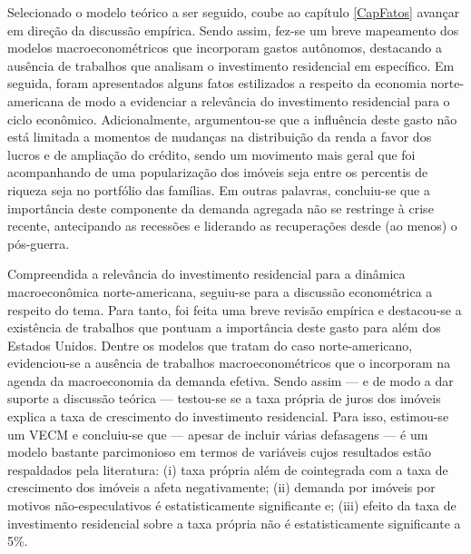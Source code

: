 Selecionado o modelo teórico a ser seguido, coube ao capítulo \ref{CapFatos} avançar em direção da discussão empírica.
Sendo assim, fez-se um breve mapeamento dos modelos macroeconométricos que incorporam gastos autônomos, destacando a ausência de trabalhos que analisam o investimento residencial em específico.
Em seguida, foram apresentados alguns fatos estilizados a respeito da economia norte-americana de modo a evidenciar a relevância do investimento residencial para o ciclo econômico.
Adicionalmente, argumentou-se que a influência deste gasto não está limitada a momentos de mudanças na distribuição da renda a favor dos lucros e de ampliação do crédito, sendo um movimento mais geral que foi acompanhando de uma popularização dos imóveis seja entre os percentis de riqueza seja no portfólio das famílias.
Em outras palavras,
concluiu-se que a importância deste componente da demanda agregada não se restringe à crise recente, antecipando as recessões  e liderando as recuperações desde (ao menos) o pós-guerra.


Compreendida a relevância do investimento residencial para a dinâmica macroeconômica norte-americana, seguiu-se para a discussão econométrica a respeito do tema.
Para tanto, foi feita uma breve revisão empírica e destacou-se a existência de trabalhos que pontuam a importância deste gasto para além dos Estados Unidos.
Dentre os modelos que tratam do caso norte-americano, evidenciou-se a ausência de trabalhos macroeconométricos que o incorporam na agenda da macroeconomia da demanda efetiva.
Sendo assim --- e de modo a dar suporte a discussão teórica --- testou-se se a taxa própria de juros dos imóveis explica a taxa de crescimento do investimento residencial.
Para isso, estimou-se um VECM  e concluiu-se que --- apesar de incluir várias defasagens --- é um modelo bastante parcimonioso em termos de variáveis cujos resultados estão respaldados pela literatura:
(i) taxa própria além de cointegrada com a taxa de crescimento dos imóveis a afeta negativamente; (ii) demanda por imóveis por motivos não-especulativos é estatisticamente significante e; (iii) efeito da taxa de investimento residencial sobre a taxa própria não é estatisticamente significante a 5\%.


